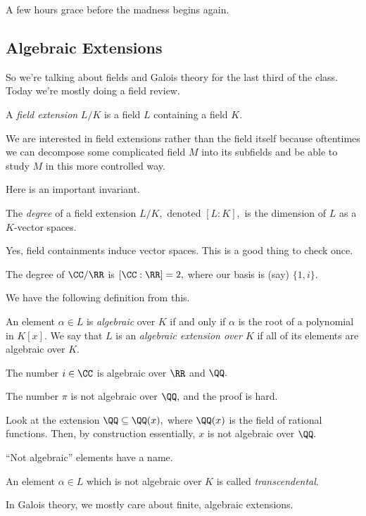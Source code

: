 \documentclass[../notes.tex]{subfiles}
\begin{document}


















A few hours grace before the madness begins again.

\subsection{Algebraic Extensions}
So we're talking about fields and Galois theory for the last third of the class. Today we're mostly doing a field review.
\begin{definition}
	A \textit{field extension} $L/K$ is a field $L$ containing a field $K.$
\end{definition}
We are interested in field extensions rather than the field itself because oftentimes we can decompose some complicated field $M$ into its subfields and be able to study $M$ in this more controlled way.

Here is an important invariant.
\begin{definition}[Degree]
	The \textit{degree} of a field extension $L/K,$ denoted $[L:K],$ is the dimension of $L$ as a $K$-vector spaces.
\end{definition}
\begin{remark}
	Yes, field containments induce vector spaces. This is a good thing to check once.
\end{remark}
\begin{example}
	The degree of $\CC/\RR$ is $[\CC:\RR]=2,$ where our basis is (say) $\{1,i\}.$
\end{example}
We have the following definition from this.
\begin{definition}[Algebraic]
	An element $\alpha\in L$ is \textit{algebraic} over $K$ if and only if $\alpha$ is the root of a polynomial in $K[x].$ We say that $L$ is an \textit{algebraic extension over $K$} if all of its elements are algebraic over $K.$
\end{definition}
\begin{example}
	The number $i\in\CC$ is algebraic over $\RR$ and $\QQ.$
\end{example}
\begin{nex}
	The number $\pi$ is not algebraic over $\QQ,$ and the proof is hard.
\end{nex}
\begin{nex}
	Look at the extension $\QQ\subseteq\QQ(x),$ where $\QQ(x)$ is the field of rational functions. Then, by construction essentially, $x$ is not algebraic over $\QQ.$
\end{nex}
``Not algebraic'' elements have a name.
\begin{definition}[Transcendental]
	An element $\alpha\in L$ which is not algebraic over $K$ is called \textit{transcendental}.
\end{definition}
In Galois theory, we mostly care about finite, algebraic extensions.
\end{document}
